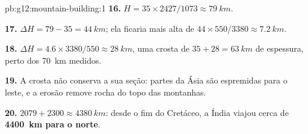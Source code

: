 \begin{solution}{pb:g12:mountain-building:1}
\textbf{16.} $H = 35 \times 2427/1073 \approx \qty{79}{km}$.

\textbf{17.} $\Delta H = 79 - 35 = \qty{44}{km}$; ela ficaria mais alta de
$44 \times 550/3380 \approx \qty{7.2}{km}$.

\textbf{18.} $\Delta H = 4.6 \times 3380/550 \approx \qty{28}{km}$, uma
crosta de $35 + 28 = \qty{63}{km}$ de espessura, perto dos \qty{70}{km}
medidos.

\textbf{19.} A crosta não conserva a sua seção: partes da Ásia são
espremidas para o leste, e a erosão remove rocha do topo das montanhas.

\textbf{20.} $2079 + 2300 \approx \qty{4380}{km}$: desde o fim do
Cretáceo, a Índia viajou cerca de \textbf{\qty{4400}{km} para o norte}.
\end{solution}
